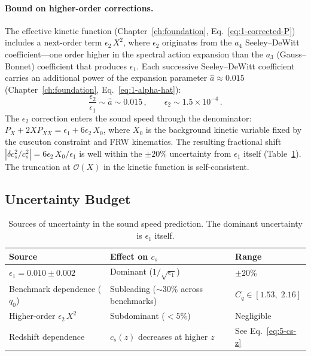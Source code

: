 \paragraph{Bound on higher-order corrections.} The effective kinetic function (Chapter~\ref{ch:foundation}, Eq.~\eqref{eq:1-corrected-P}) includes a next-order term $\epsilon_2\, X^2$, where $\epsilon_2$ originates from the $a_4$ Seeley--DeWitt coefficient---one order higher in the spectral action expansion than the $a_3$ (Gauss--Bonnet) coefficient that produces $\epsilon_1$. Each successive Seeley--DeWitt coefficient carries an additional power of the expansion parameter $\hat{a} \approx 0.015$ (Chapter~\ref{ch:foundation}, Eq.~\eqref{eq:1-alpha-hat}):
\begin{equation}
\label{eq:5-eps2-bound}
\frac{\epsilon_2}{\epsilon_1} \sim \hat{a} \sim 0.015\,, \qquad \epsilon_2 \sim 1.5 \times 10^{-4}\,.
\end{equation}
The $\epsilon_2$ correction enters the sound speed through the denominator: $P_X + 2XP_{XX} = \epsilon_1 + 6\epsilon_2\, X_0$, where $X_0$ is the background kinetic variable fixed by the cuscuton constraint and FRW kinematics. The resulting fractional shift $|\delta c_s^2 / c_s^2| = 6\epsilon_2\, X_0/\epsilon_1$ is well within the $\pm 20\%$ uncertainty from $\epsilon_1$ itself (Table~\ref{tab:5-2}). The truncation at $\mathcal{O}(X)$ in the kinetic function is self-consistent.

\subsection{Uncertainty Budget}
\label{sec:5-uncertainty}

\begin{table}[ht]
\centering
\caption{Sources of uncertainty in the sound speed prediction. The dominant uncertainty is $\epsilon_1$ itself.}
\label{tab:5-2}
\begin{tabular}{lll}
\toprule
Source & Effect on $c_s$ & Range \\
\midrule
$\epsilon_1 = 0.010 \pm 0.002$ & Dominant ($1/\sqrt{\epsilon_1}$) & $\pm 20\%$ \\
Benchmark dependence ($q_0$) & Subleading ($\sim 30\%$ across benchmarks) & $C_q \in [1.53,\; 2.16]$ \\
Higher-order $\epsilon_2\,X^2$ & Subdominant ($< 5\%$) & Negligible \\
Redshift dependence & $c_s(z)$ decreases at higher $z$ & See Eq.~\eqref{eq:5-cs-z} \\
\bottomrule
\end{tabular}
\end{table}

